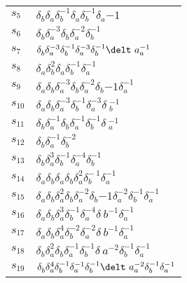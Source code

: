 \documentclass{article}
\begin{document}
\begin{center}
\begin{tabular}{ll}
$s_{5}$ & $\delta_b^{}\delta_a^{}\delta_b^{-1}\delta_a^{}\delta_b^{-1}\delta_a^\
{-1}$ \\
$s_{6}$ & $\delta_b^{}\delta_a^{-3}\delta_b^{}\delta_a^{-2}\delta_b^{-1}$ \\
$s_{7}$ & $\delta_b^{}\delta_a^{-3}\delta_b^{-1}\delta_a^{-3}\delta_b^{-1}\delt\
a_a^{-1}$ \\
$s_{8}$ & $\delta_a^{}\delta_b^{2}\delta_a^{}\delta_b^{-1}\delta_a^{-1}$ \\
$s_{9}$ & $\delta_a^{}\delta_b^{}\delta_a^{-3}\delta_b^{}\delta_a^{-2}\delta_b^\
{-1}\delta_a^{-1}$ \\
$s_{10}$ & $\delta_a^{}\delta_b^{}\delta_a^{-3}\delta_b^{-1}\delta_a^{-3}\delta\
_b^{-1}$ \\
$s_{11}$ & $\delta_b^{}\delta_a^{-1}\delta_b^{}\delta_a^{-1}\delta_b^{-1}\delta\
_a^{-1}$ \\
$s_{12}$ & $\delta_b^{}\delta_a^{-1}\delta_b^{-2}$ \\
$s_{13}$ & $\delta_b^{}\delta_a^{3}\delta_b^{-1}\delta_a^{-4}\delta_b^{-1}$ \\
$s_{14}$ & $\delta_a^{}\delta_b^{}\delta_a^{}\delta_b^{}\delta_a^{2}\delta_b^{-\
1}\delta_a^{-1}$ \\
$s_{15}$ & $\delta_a^{}\delta_b^{}\delta_a^{2}\delta_b^{}\delta_a^{-2}\delta_b^\
{-1}\delta_a^{-2}\delta_b^{-1}\delta_a^{-1}$ \\
$s_{16}$ & $\delta_a^{}\delta_b^{}\delta_a^{3}\delta_b^{-1}\delta_a^{-4}\delta_\
b^{-1}\delta_a^{-1}$ \\
$s_{17}$ & $\delta_a^{}\delta_b^{}\delta_a^{4}\delta_b^{-2}\delta_a^{-2}\delta_\
b^{-1}\delta_a^{-1}$ \\
$s_{18}$ & $\delta_b^{}\delta_a^{2}\delta_b^{}\delta_a^{-1}\delta_b^{-1}\delta_\
a^{-2}\delta_b^{-1}\delta_a^{-1}$ \\
$s_{19}$ & $\delta_b^{}\delta_a^{4}\delta_b^{-1}\delta_a^{-1}\delta_b^{-1}\delt\
a_a^{-2}\delta_b^{-1}\delta_a^{-1}$ \\
\bottomrule
\end{tabular}
\end{center}

\thispagestyle{empty}
\end{document}
